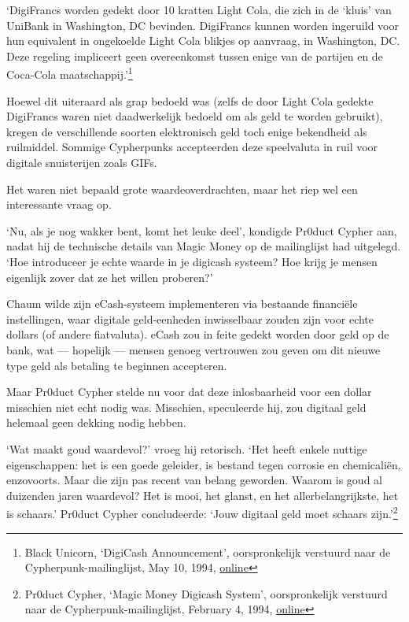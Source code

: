 \documentclass[
  a5paper,
  smalldemyvopaper,11pt,twoside,onecolumn,openright,extrafontsizes,
hidelinks]{memoir}
\begin{document}
`DigiFrancs worden gedekt door 10 kratten Light Cola, die zich in de
`kluis' van UniBank in Washington, DC bevinden. DigiFrancs kunnen worden
ingeruild voor hun equivalent in ongekoelde Light Cola blikjes op
aanvraag, in Washington, DC. Deze regeling impliceert geen overeenkomst
tussen enige van de partijen en de Coca-Cola maatschappij.'\footnote{Black
  Unicorn, `DigiCash Announcement', oorspronkelijk verstuurd naar de
  Cypherpunk-mailinglijst, May 10, 1994,
  \href{https://cypherpunks.venona.com/date/1994/05/msg00616.html}{online}}

Hoewel dit uiteraard als grap bedoeld was (zelfs de door Light Cola
gedekte DigiFrancs waren niet daadwerkelijk bedoeld om als geld te
worden gebruikt), kregen de verschillende soorten elektronisch geld toch
enige bekendheid als ruilmiddel. Sommige Cypherpunks accepteerden deze
speelvaluta in ruil voor digitale snuisterijen zoals GIFs.

Het waren niet bepaald grote waardeoverdrachten, maar het riep wel een
interessante vraag op.

`Nu, als je nog wakker bent, komt het leuke deel', kondigde Pr0duct
Cypher aan, nadat hij de technische details van Magic Money op de
mailinglijst had uitgelegd. `Hoe introduceer je echte waarde in je
digicash systeem? Hoe krijg je mensen eigenlijk zover dat ze het willen
proberen?'

Chaum wilde zijn eCash-systeem implementeren via bestaande financiële
instellingen, waar digitale geld-eenheden inwisselbaar zouden zijn voor
echte dollars (of andere fiatvaluta). eCash zou in feite gedekt worden
door geld op de bank, wat --- hopelijk --- mensen genoeg vertrouwen zou
geven om dit nieuwe type geld als betaling te beginnen accepteren.

Maar Pr0duct Cypher stelde nu voor dat deze inlosbaarheid voor een
dollar misschien niet echt nodig was. Misschien, speculeerde hij, zou
digitaal geld helemaal geen dekking nodig hebben.

`Wat maakt goud waardevol?' vroeg hij retorisch. `Het heeft enkele
nuttige eigenschappen: het is een goede geleider, is bestand tegen
corrosie en chemicaliën, enzovoorts. Maar die zijn pas recent van belang
geworden. Waarom is goud al duizenden jaren waardevol? Het is mooi, het
glanst, en het allerbelangrijkste, het is schaars.' Pr0duct Cypher
concludeerde: `Jouw digitaal geld moet schaars zijn.'\footnote{Pr0duct
  Cypher, `Magic Money Digicash System', oorspronkelijk verstuurd naar
  de Cypherpunk-mailinglijst, February 4, 1994,
  \href{https://cypherpunks.venona.com/date/1994/02/msg00247.html}{online}}
\end{document}

